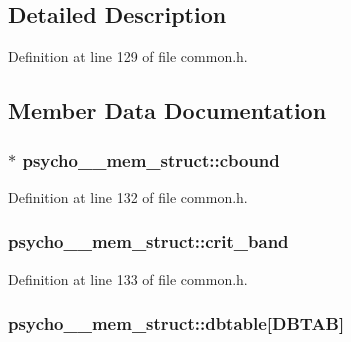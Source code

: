 \subsection{Detailed Description}


Definition at line 129 of file common.\+h.



\subsection{Member Data Documentation}
\subsubsection[{\texorpdfstring{cbound}{cbound}}]{$\ast$ psycho\+\_\+\_\+mem\+\_\+struct\+::cbound}\hypertarget{structpsycho__1__mem__struct_ad5c10270d0c010701290271dad278c73}{}\label{structpsycho__1__mem__struct_ad5c10270d0c010701290271dad278c73}


Definition at line 132 of file common.\+h.

\subsubsection[{\texorpdfstring{crit\+\_\+band}{crit_band}}]{ psycho\+\_\+\_\+mem\+\_\+struct\+::crit\+\_\+band}\hypertarget{structpsycho__1__mem__struct_ad7e94feac1d79c9e5de0414ebad97d5c}{}\label{structpsycho__1__mem__struct_ad7e94feac1d79c9e5de0414ebad97d5c}


Definition at line 133 of file common.\+h.

\subsubsection[{\texorpdfstring{dbtable}{dbtable}}]{ psycho\+\_\+\_\+mem\+\_\+struct\+::dbtable\mbox{[}{\bf D\+B\+T\+AB}\mbox{]}}\hypertarget{structpsycho__1__mem__struct_ac3ed9fc5d17b6769b607f30b59171f7f}{}\label{structpsycho__1__mem__struct_ac3ed9fc5d17b6769b607f30b59171f7f}


